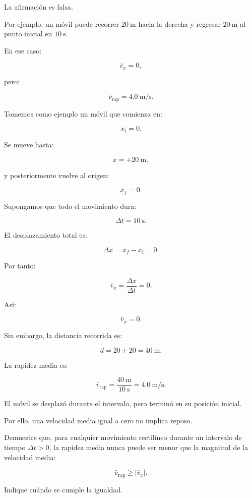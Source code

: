 \begin{respuesta}
La afirmación es falsa.

Por ejemplo, un móvil puede recorrer \(\SI{20}{\meter}\) hacia la derecha y regresar \(\SI{20}{\meter}\) al punto inicial en \(\SI{10}{\second}\).

En ese caso:

\[
\bar{v}_x=0,
\]

pero:

\[
\bar{v}_{\mathrm{rap}}=\SI{4.0}{\meter\per\second}.
\]
\end{respuesta}

\begin{explicacion}
Tomemos como ejemplo un móvil que comienza en:

\[ x_i=0. \]

Se mueve hasta:

\[ x=+\SI{20}{\meter}, \]

y posteriormente vuelve al origen:

\[ x_f=0. \]

Supongamos que todo el movimiento dura:

\[ \Delta t=\SI{10}{\second}. \]

El desplazamiento total es:

\[
\Delta x
=
x_f-x_i
=
0.
\]

Por tanto:

\[
\bar{v}_x
=
\frac{\Delta x}{\Delta t}
=
0.
\]

Así:

\[ \boxed{\bar{v}_x=0}. \]

Sin embargo, la distancia recorrida es:

\[
d
=
20+20
=
\SI{40}{\meter}.
\]

La rapidez media es:

\[
\bar{v}_{\mathrm{rap}}
=
\frac{\SI{40}{\meter}}
{\SI{10}{\second}}
=
\boxed{\SI{4.0}{\meter\per\second}}.
\]

El móvil se desplazó durante el intervalo, pero terminó en su posición inicial.

Por ello, una velocidad media igual a cero no implica reposo.
\end{explicacion}


\begin{ejercicio}
Demuestre que, para cualquier movimiento rectilíneo durante un intervalo de tiempo \(\Delta t>0\), la rapidez media nunca puede ser menor que la magnitud de la velocidad media:

\[ \bar{v}_{\mathrm{rap}}\geq|\bar{v}_x|. \]

Indique cuándo se cumple la igualdad.
\end{ejercicio}

